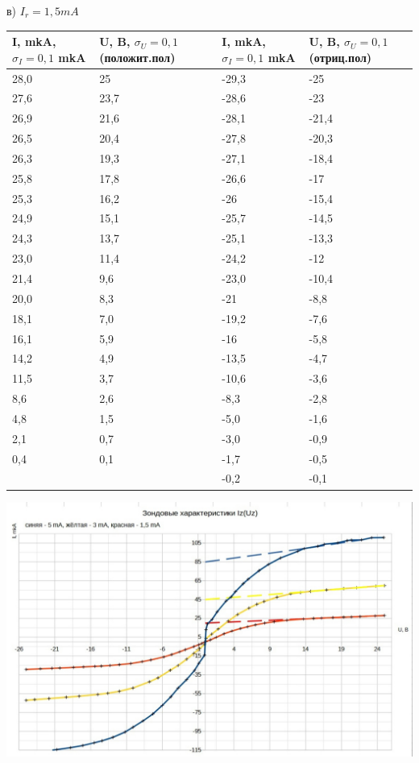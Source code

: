 \documentclass[11pt]{article}
\begin{document}
в) $I_r = 1,5 mA$\\
\begin{tabular}{|l|l|l|l|}
\hline
I, mkA, $\sigma_I = 0,1$ mkA & U, B, $\sigma_U = 0,1$ (положит.пол) & I, mkA, $\sigma_I = 0,1$ mkA & U, B, $\sigma_U = 0,1$ (отриц.пол)\\
\hline
28,0& 25 &-29,3 &-25
\\
\hline
27,6 & 23,7 & -28,6 & -23
\\
\hline
26,9 & 21,6 & -28,1& -21,4
\\
\hline
26,5 & 20,4 & -27,8 & -20,3
\\
\hline
26,3 & 19,3 & -27,1 & -18,4
\\
\hline
25,8 & 17,8 & -26,6 & -17
\\
\hline
25,3 & 16,2& -26& -15,4
\\
\hline
24,9 & 15,1& -25,7 & -14,5
\\
\hline
24,3 & 13,7& -25,1& -13,3
\\
\hline
23,0 & 11,4 & -24,2 & -12
\\
\hline
21,4 & 9,6 & -23,0& -10,4
\\
\hline
20,0 & 8,3 & -21& -8,8
\\
\hline
18,1 & 7,0 & -19,2& -7,6
\\
\hline
16,1 & 5,9 & -16& -5,8
\\
\hline
14,2 & 4,9 & -13,5& -4,7
\\
\hline
11,5 & 3,7& -10,6& -3,6
\\
\hline
8,6 & 2,6 & -8,3& -2,8
\\
\hline
4,8 & 1,5 & -5,0& -1,6
\\
\hline
2,1 & 0,7 & -3,0& -0,9
\\
\hline
0,4 & 0,1& -1,7& -0,5
\\
\hline
& & -0,2 & -0,1
\\
\hline
\end{tabular}
\includegraphics[width = 19.5cm]{vahz}\\
\end{document}
